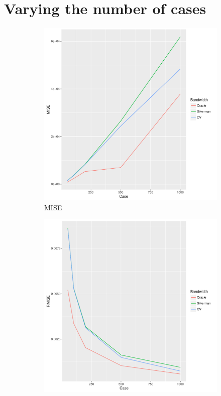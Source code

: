 \section{Varying the number of cases}
\label{sec:results:unif_NCases_1h}

\begin{figure}[tb]
    \centering
    \begin{subfigure}[b]{0.45\textwidth}
    \includegraphics[width=\textwidth]{results/by_num_cases/MISE-vs-cases}
    \caption{MISE}
    \end{subfigure}
    \begin{subfigure}[b]{0.45\textwidth}
    \includegraphics[width=\textwidth]{results/by_num_cases/RMISE-vs-cases}

\end{subfigure}
\end{figure}
